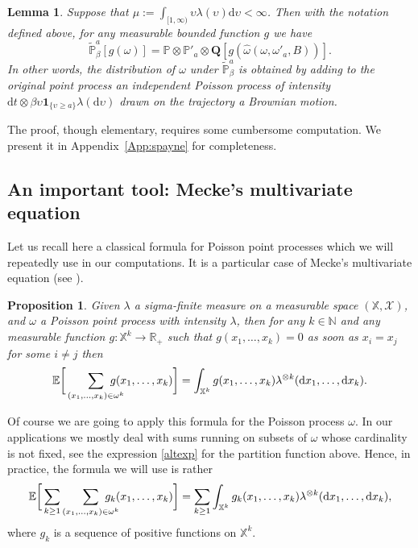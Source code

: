 \documentclass[JEP,XML,SOM,Unicode,published]{cedram}
\let\mathcal\mathscr
\newtheorem{lemma}[theorem]{Lemma}
\newtheorem{proposition}[theorem]{Proposition}
\theoremstyle{definition}
\newcommand{\dd}{\mathrm{d}}
\newcommand{\ind}{\mathbf{1}}
\newcommand{\bQ}{{\ensuremath{\mathbf Q}} }
\newcommand{\bbE}{{\ensuremath{\mathbb E}} }
\newcommand{\bbN}{{\ensuremath{\mathbb N}} }
\newcommand{\bbP}{{\ensuremath{\mathbb P}} }
\newcommand{\bbR}{{\ensuremath{\mathbb R}} }
\newcommand{\bbX}{{\ensuremath{\mathbb X}} }
\let\gl\lambda
\let\ups\upsilon
\let\go\omega
\begin{document}
\begin{lemma}\label{spayne}
Suppose that $\mu:=\int_{[1,\infty)} \ups \gl(\ups)\dd \ups<\infty$.
Then with the notation defined above, for any measurable bounded function $g$ we have
\begin{equation}\label{sides}
\tilde \bbP^a_{\beta}[ g(\go)]= \bbP\otimes \bbP'_a\otimes \bQ[ g(\hat \go(\go,\go'_a,B))].
\end{equation}
In other words, the distribution of $\go$ under $\tilde \bbP^a_{\beta}$ is obtained by adding to the original point process an independent Poisson process of intensity
$\dd t \otimes \beta\ups \ind_{\{\ups \geq a\}} \gl(\dd \ups)$ drawn on the trajectory a Brownian motion.
\end{lemma}
The proof, though elementary, requires some cumbersome computation. We present it in Appendix~\ref{App:spayne} for completeness.

\subsection{An important tool: Mecke's multivariate equation}

Let us recall here a classical formula for Poisson point processes which we will repeatedly use in our computations.
It is a particular case of Mecke's multivariate equation
(see \eg \cite[Th.\,4.4]{PoiBook}).

\begin{proposition}\label{OKLMecke}
Given $\gl$ a sigma-finite measure on a measurable space $(\bbX,\mathcal{X})$, and $\go$
a Poisson point process with intensity $\gl$, then
for any $k\in \bbN$ and any measurable function $g: \bbX^k \to \bbR_+$ such that $g (x_1,\dots, x_k)=0 $ as soon as $x_i=x_j$ for some $i\ne j$ then
\begin{equation}
\bbE \bigg[ \sum_{(x_1,\dots, x_k)\in \go^k}\hspace*{-5mm} g(x_1,\dots, x_k) \bigg]= \int_{\bbX^k} g(x_1,\dots,x_k) \gl^{\otimes k}(\dd x_1,\dots,\dd x_k).
\end{equation}

\end{proposition}
Of course we are going to apply this formula for the Poisson process $\go$. In our applications we mostly deal with sums running on subsets of $\go$ whose cardinality is not fixed, see the expression \eqref{altexp} for the partition function above. Hence, in practice, the formula we will use is rather
\begin{equation}\label{nonfixedcard}
\bbE \bigg[ \sum_{k\ge 1} \sum_{(x_1,\dots, x_k)\in \go^k}\hspace*{-5mm} g_k(x_1,\dots, x_k) \bigg]= \sum_{k\ge 1} \int_{\bbX^k} g_k(x_1,\dots,x_k) \gl^{\otimes k}(\dd x_1,\dots,\dd x_k),
\end{equation}
where $g_k$ is a sequence of positive functions on $\bbX^k$.
\end{document}
